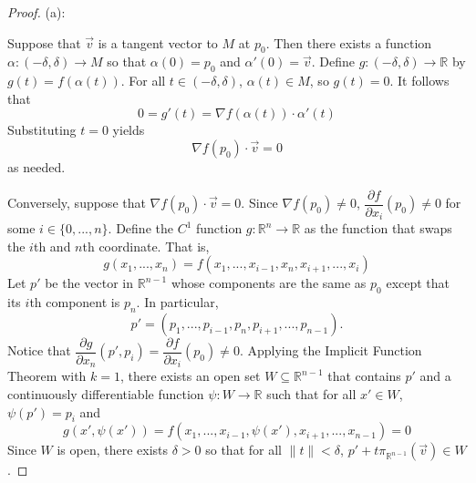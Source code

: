 \documentclass{article}
\theoremstyle{plain} %
\numberwithin{thm}{section} %
\theoremstyle{definition}
\begin{document}
        \begin{proof}
            (a):

        Suppose that \(\vec{v}\) is a tangent vector to \(M\) at \(p_0\). Then there exists a function \(\alpha : (-\delta , \delta ) \to M\) so that \(\alpha (0) = p_0\) and \(\alpha '(0) = \vec{v}\). Define \(g: (-\delta , \delta ) \to \mathbb{R}\) by \(g(t) = f(\alpha(t))\). For all \(t \in (-\delta ,\delta)\), \(\alpha (t) \in M\), so \(g(t) = 0\). It follows that
        \[
            0 = g'(t) = \nabla f(\alpha (t)) \cdot \alpha '(t)
        \]
        Substituting \(t = 0\) yields
        \[
            \nabla f(p_0) \cdot \vec{v} = 0
        \]
        as needed.

        \medskip

        Conversely, suppose that \(\nabla f(p_0) \cdot \vec{v} = 0\). Since \(\nabla f(p_0) \neq 0\), \(\dfrac{\partial f}{\partial x_i}(p_0) \neq 0\) for some \(i \in \{0, ..., n\}\). Define the \(C^1\) function \(g: \mathbb{R}^n \to \mathbb{R}\) as the function that swaps the \(i\)th and \(n\)th coordinate. That is,
        \[
            g(x_1, ..., x_n) = f(x_1, ..., x_{i-1}, x_n, x_{i+1}, ..., x_i)
        \]
        Let \(p'\) be the vector in \(\mathbb{R}^{n-1}\) whose components are the same as \(p_0\) except that its \(i\)th component is \(p_n\). In particular,
        \[
            p' = (p_1, ..., p_{i-1}, p_n, p_{i+1}, ..., p_{n-1}).
        \]
        Notice that \(\dfrac{\partial g}{\partial x_n}(p', p_i) = \dfrac{\partial f}{\partial x_i}(p_0) \neq 0\). Applying the Implicit Function Theorem with \(k = 1\), there exists an open set \(W \subseteq \mathbb{R}^{n-1}\) that contains \(p'\) and a continuously differentiable function \(\psi : W \to \mathbb{R}\) such that for all \(x' \in W\), \(\psi (p') = p_i\) and
        \[
            g(x', \psi(x')) = f(x_1, ..., x_{i-1} , \psi (x'), x_{i+1}, ..., x_{n-1}) = 0
        \]
        Since \(W\) is open, there exists \(\delta > 0\) so that for all \(\|t\| < \delta\), \(p' + t \pi _{\mathbb{R}^{n-1}}(\vec{v}) \in W\).


\end{proof}
\end{document}
